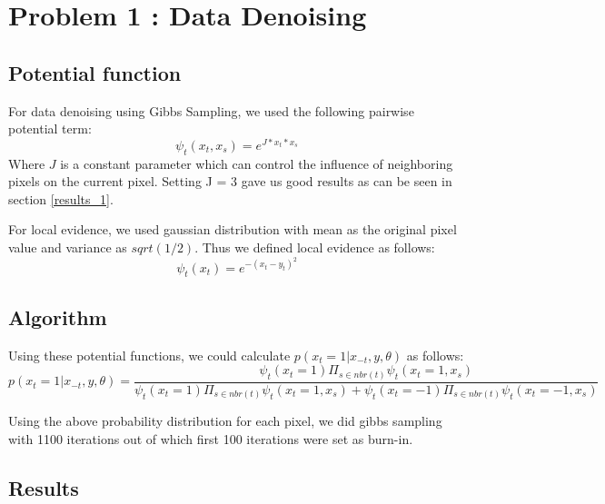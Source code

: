 \documentclass{article}
\begin{document}




\section{Problem 1 : Data Denoising}
\subsection{Potential function}
For data denoising using Gibbs Sampling, we used the following pairwise potential term:\\
\begin{equation}
\psi_t(x_t, x_s) = e^{J*x_t*x_s}
\end{equation}
Where $J$ is a constant parameter which can control the influence of neighboring pixels on the current pixel. Setting J = 3 gave us good results as can be seen in section \ref{results_1}.

For local evidence, we used gaussian distribution with mean as the original pixel value and variance as $sqrt(1/2)$. Thus we defined local evidence as follows:
\begin{equation}
\psi_t(x_t) = e^{-(x_t - y_t)^2}
\end{equation}

\subsection{Algorithm}
Using these potential functions, we could calculate $p(x_t=1| x_{-t},y,\theta)$ as follows:
\begin{equation}
p(x_t=1| x_{-t},y,\theta) = \frac{\psi_t(x_t=1)\Pi_{s \in nbr(t)}\psi_t(x_t=1, x_s)}{\psi_t(x_t=1)\Pi_{s \in nbr(t)}\psi_t(x_t=1, x_s) + \psi_t(x_t=-1)\Pi_{s \in nbr(t)}\psi_t(x_t=-1, x_s)}
\end{equation}


Using the above probability distribution for each pixel, we did gibbs sampling with 1100 iterations out of which first 100 iterations were set as burn-in.

\subsection{Results}
\end{document}
